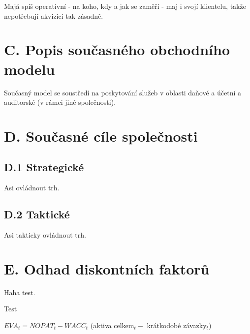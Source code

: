 Majá spíš operativní - na koho, kdy a jak se zaměří - maj i svojí klientelu, takže nepotřebují akvizici tak zásadně.

\section*{C. Popis současného obchodního modelu}

Současný model se soustředí na poskytování služeb v oblasti daňové a účetní a auditorské (v rámci jiné společnosti).

\newpage



\section*{D. Současné cíle společnosti}

\subsection*{D.1 Strategické}

Asi ovládnout trh.

\subsection*{D.2 Taktické}

Asi takticky ovládnout trh.

\section*{E. Odhad diskontních faktorů}

Haha test.

Test 

$EVA_t = NOPAT_t - WACC_t$ (aktiva celkem$_t -$ krátkodobé závazky$_t$)

